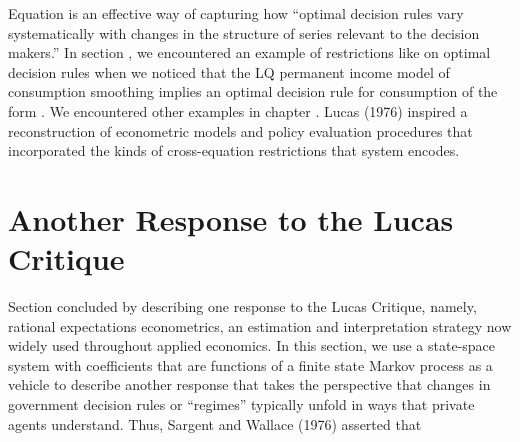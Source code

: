  Equation  is an effective way of capturing  how ``optimal decision rules vary systematically with changes in the structure of
 series relevant to the decision makers.'' In
 section , we   encountered an example of   restrictions like   on optimal decision rules  when we noticed that the LQ permanent income model of consumption smoothing implies an optimal decision rule
   for consumption of the form . We encountered other  examples  in chapter .
    Lucas (1976) inspired  a  reconstruction of   econometric models  and policy evaluation procedures  that  incorporated
      the kinds of cross-equation
restrictions  that system  encodes.
%
%
%


\section{Another Response to the Lucas Critique}\label{sec:lucascritique2}%
Section  concluded by describing  one  response to the Lucas Critique,  namely,
rational expectations econometrics, an estimation and interpretation strategy now widely used throughout  applied economics.
In this section, we use a  state-space system with coefficients that are functions of a finite state Markov process 
as a vehicle to describe
another  response that  
 takes the perspective  that 
changes in  government  decision rules  or ``regimes''  typically  
unfold in ways that private agents understand.  %
Thus, 
Sargent and Wallace (1976) asserted that 


